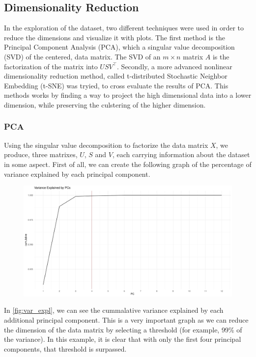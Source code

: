 \documentclass[11pt,twoside]{article}
\numberwithin{Theorem}{section}
\numberwithin{Definition}{section}
\numberwithin{Lemma}{section}
\numberwithin{Algorithm}{section}
\numberwithin{equation}{section}
\begin{document}
\subsection{Dimensionality Reduction}
\label{sec:reduction}
In the exploration of the dataset, two different techniques were used in order to reduce the dimensions and visualize it with plots. The first method is the Principal Component Analysis (PCA), which a singular value decomposition (SVD) of the centered, data matrix. The SVD of an $ m \times n $ matrix $A$ is the factorization of the matrix into $USV^\top$. Secondly, a more advanced nonlinear dimensionality reduction method, called t-distributed Stochastic Neighbor Embedding (t-SNE) was tryied, to cross evaluate the results of PCA. This methods works by finding a way to project the high dimensional data into a lower dimension, while preserving the culstering of the higher dimension.

\subsubsection{PCA}
\label{sec:pca}

Using the singular value decomposition to factorize the data matrix $X$, we produce, three matrixes, $U$, $S$ and $V$, each carrying information about the dataset in some aspect. First of all, we can create the following graph of the percentage of variance explained by each principal component. 
\vspace*{1em}
\begin{figure}[!h]
\centering
\includegraphics[width=\textwidth]{./output/1.a.pca-var-expl.pdf}
\caption{}
\label{fig:var_expl}
\end{figure}
\vspace{2em}

In \autoref{fig:var_expl}, we can see the cummalative variance explained by each additional principal component. This is a very important graph as we can reduce the dimension of the data matrix by selecting a threshold (for example, 99\% of the variance). In this example, it is clear that with only the first four principal components, that threshold is surpassed.
\end{document}

